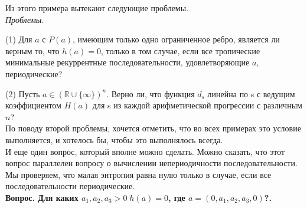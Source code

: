 \documentclass[russian]{lecture-notes}
\begin{document}
Из этого примера вытекают следующие проблемы.\\

\emph{ Проблемы.}

(1) Для $a$ с $P(a)$, имеющим только одно ограниченное ребро, является ли верным то, что $h(a) = 0$, только в том случае, если все тропические минимальные рекуррентные последовательности, удовлетворяющие $a$, периодические?

(2) Пусть $a \in (\mathbb{R} \cup \{ \infty \})^n$. Верно ли, что функция $d_s$ линейна по s с ведущим коэффициентом $H(a)$ для s из каждой арифметической прогрессии с различным $n$?\\

По поводу второй проблемы, хочется отметить, что во всех примерах это условие выполняется, и хотелось бы, чтобы это выполнялось всегда.\\

И еще один вопрос, который вполне можно сделать. Можно сказать, что этот вопрос параллелен вопросу о вычислении непериодичности последовательности. Мы проверяем, что малая энтропия равна нулю только в случае, если все последовательности периодические.\\

\bfseries Вопрос. \mdseries Для каких $a_1,a_2,a_3>0 \; h(a) =0$, где $a=(0,a_1,a_2,a_3,0)$?.
\end{document}
